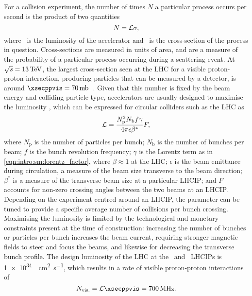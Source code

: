 For a collision experiment, the number of times $N$ a particular process occurs 
per second is the product of two quantities
\begin{equation}
  N = \mathcal{L}\sigma,
  \label{eqn:intro:lhc:lumi_xsec}
\end{equation}
where \lumi\ is the luminosity of the accelerator and \xsec\ is the 
cross-section of the process in question.
Cross-sections are measured in units of area, and are a measure of the 
probability of a particular process occurring during a scattering event.
At $\sqrts = \SI{13}{\TeV}$, the largest cross-section seen at the \ac{LHC} for 
a visible proton-proton interaction, producing particles that can be measured 
by a detector, is around $\xsecppvis = 
\SI{70}{\milli\barn}$~\cite{Aaboud:2016mmw,CMS:2016ael}.
Given that this number is fixed by the beam energy and colliding particle type, 
accelerators are usually designed to maximise the luminosity \lumi, which can 
be expressed for circular colliders such as the \ac{LHC} as
\begin{equation}
  \mathcal{L} = \frac{N_{\text{p}}^{2}N_{\text{b}}f\gamma}{4\pi\epsilon\beta^{*}}F,
\end{equation}
where $N_{\text{p}}$ is the number of particles per bunch; $N_{\text{b}}$ is 
the number of bunches per beam; $f$ is the bunch revolution frequency; $\gamma$ 
is the Lorentz term as in \cref{eqn:intro:sm:lorentz_factor}, where $\beta 
\approx 1$ at the \ac{LHC}; $\epsilon$ is the beam emittance during 
circulation, a measure of the beam size transverse to the beam direction; 
$\beta^{*}$ is a measure of the transverse beam size at a particular 
\ac{LHCIP}; and $F$ accounts for non-zero crossing angles between the two beams 
at an \ac{LHCIP}.
Depending on the experiment centred around an \ac{LHCIP}, the \betastar 
parameter can be tuned to provide a specific average number of collisions per 
bunch crossing.
Maximising the luminosity is limited by the technological and monetary 
constraints present at the time of construction: increasing the number of 
bunches or particles per bunch increases the beam current, requiring stronger 
magnetic fields to steer and focus the beams, and likewise for decreasing the 
transverse bunch profile.
The design luminosity of the \ac{LHC} at the \atlas\ and \cms\ \acp{LHCIP} is
\SI{1e34}{\per\square\centi\metre\per\second}, which results in a rate of 
visible proton-proton interactions of
\begin{equation}
  N_{\text{vis.}} = \lumi\xsecppvis
                  = \SI{700}{\mega\hertz}.
  \label{eqn:intro:lhc:nppvis}
\end{equation}


